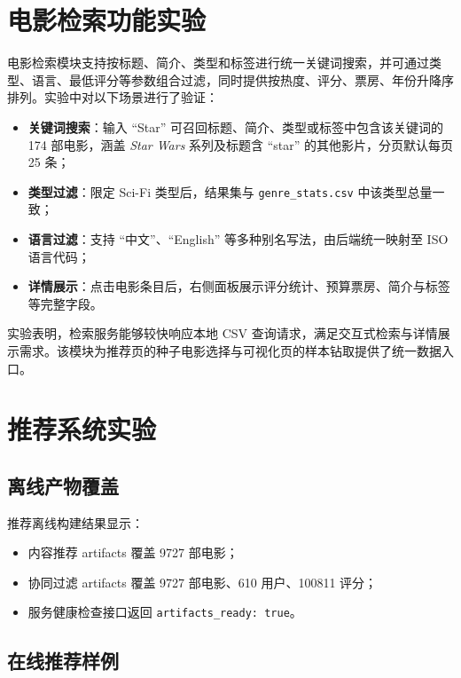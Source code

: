 \section{电影检索功能实验}
\label{sec:exp:search}

电影检索模块支持按标题、简介、类型和标签进行统一关键词搜索，并可通过类型、语言、最低评分等参数组合过滤，同时提供按热度、评分、票房、年份升降序排列。实验中对以下场景进行了验证：

\begin{itemize}
    \item \textbf{关键词搜索}：输入 ``Star'' 可召回标题、简介、类型或标签中包含该关键词的 174 部电影，涵盖 \textit{Star Wars} 系列及标题含 ``star'' 的其他影片，分页默认每页 25 条；
    \item \textbf{类型过滤}：限定 Sci-Fi 类型后，结果集与 \texttt{genre\_stats.csv} 中该类型总量一致；
    \item \textbf{语言过滤}：支持 ``中文''、``English'' 等多种别名写法，由后端统一映射至 ISO 语言代码；
    \item \textbf{详情展示}：点击电影条目后，右侧面板展示评分统计、预算票房、简介与标签等完整字段。
\end{itemize}

实验表明，检索服务能够较快响应本地 CSV 查询请求，满足交互式检索与详情展示需求。该模块为推荐页的种子电影选择与可视化页的样本钻取提供了统一数据入口。

\section{推荐系统实验}
\label{sec:exp:recommendation}

\subsection{离线产物覆盖}

推荐离线构建结果显示：

\begin{itemize}
    \item 内容推荐 artifacts 覆盖 9727 部电影；
    \item 协同过滤 artifacts 覆盖 9727 部电影、610 用户、100811 评分；
    \item 服务健康检查接口返回 \texttt{artifacts\_ready: true}。
\end{itemize}

\subsection{在线推荐样例}

